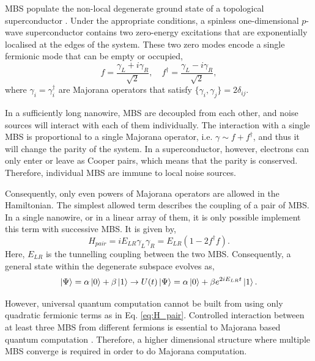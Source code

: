 MBS populate the non-local degenerate ground state of a topological superconductor \cite{Kitaev2000}.
Under the appropriate conditions, a spinless one-dimensional $p$-wave superconductor contains two zero-energy excitations that are exponentially localised at the edges of the system. 
These two zero modes encode a single fermionic mode that can be empty or occupied, 
\begin{equation}
f = \frac{\gamma_{L} + i\gamma_{R}}{\sqrt{2}}, \quad f^{\dagger} = \frac{\gamma_{L} - i \gamma_{R}}{\sqrt{2}},
\end{equation}
where $\gamma_{i} = \gamma_{i}^{\dagger}$ are Majorana operators that satisfy $\{ \gamma_{i}, \gamma_{j} \} = 2\delta_{ij}$.

In a sufficiently long nanowire, MBS are decoupled from each other, and noise sources will interact with each of them individually.
The interaction with a single MBS is proportional to a single Majorana operator, i.e. $\gamma \sim f + f^{\dagger}$, and thus it will change the parity of the system.
In a superconductor, however, electrons can only enter or leave as Cooper pairs, which means that the parity is conserved. 
Therefore, individual MBS are immune to local noise sources.

Consequently, only even powers of Majorana operators are allowed in the Hamiltonian.
The simplest allowed term describes the coupling of a pair of MBS.
In a single nanowire, or in a linear array of them, it is only possible implement this term with successive MBS.
It is given by,
\begin{equation}\label{eq:H_pair}
H_{pair} = i E_{LR} \gamma_{L} \gamma_{R} = E_{LR} (1 - 2 f^{\dagger} f).
\end{equation}
Here, $E_{LR}$ is the tunnelling coupling between the two MBS.
Consequently, a general state within the degenerate subspace evolves as,
\begin{equation}
\ket{\Psi}  = \alpha \ket 0 +\beta \ket 1 \rightarrow U(t) \ket{\Psi} = \alpha \ket 0 + \beta e^{2 i E_{LR} t} \ket 1.
\end{equation}

However, universal quantum computation cannot be built from using only quadratic fermionic terms \cite{Terhal2001} as in Eq. \ref{eq:H_pair}.
Controlled interaction between at least three MBS from different fermions is essential to Majorana based quantum computation \cite{Sau2011,Leijnse2012,Bauer2018}.
Therefore, a higher dimensional structure where multiple MBS converge is required in order to do Majorana computation.

